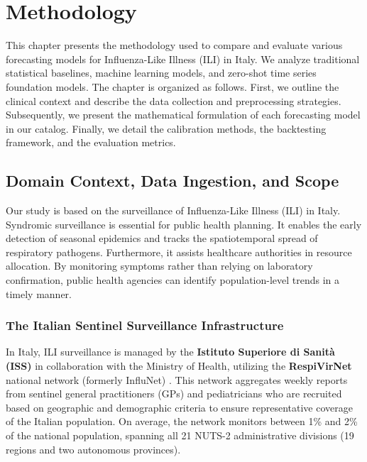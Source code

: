 
\chapter{Methodology}
\label{ch:methodology}

This chapter presents the methodology used to compare and evaluate various forecasting models for Influenza-Like Illness (ILI) in Italy. We analyze traditional statistical baselines, machine learning models, and zero-shot time series foundation models. The chapter is organized as follows. First, we outline the clinical context and describe the data collection and preprocessing strategies. Subsequently, we present the mathematical formulation of each forecasting model in our catalog. Finally, we detail the calibration methods, the backtesting framework, and the evaluation metrics.


\section{Domain Context, Data Ingestion, and Scope}

Our study is based on the surveillance of Influenza-Like Illness (ILI) in Italy. Syndromic surveillance is essential for public health planning. It enables the early detection of seasonal epidemics and tracks the spatiotemporal spread of respiratory pathogens. Furthermore, it assists healthcare authorities in resource allocation. By monitoring symptoms rather than relying on laboratory confirmation, public health agencies can identify population-level trends in a timely manner.

\subsection{The Italian Sentinel Surveillance Infrastructure}
In Italy, ILI surveillance is managed by the \textbf{Istituto Superiore di Sanità (ISS)} in collaboration with the Ministry of Health, utilizing the \textbf{RespiVirNet} national network (formerly InfluNet) \cite{respivirnet}. This network aggregates weekly reports from sentinel general practitioners (GPs) and pediatricians who are recruited based on geographic and demographic criteria to ensure representative coverage of the Italian population. On average, the network monitors between 1\% and 2\% of the national population, spanning all 21 NUTS-2 administrative divisions (19 regions and two autonomous provinces).

